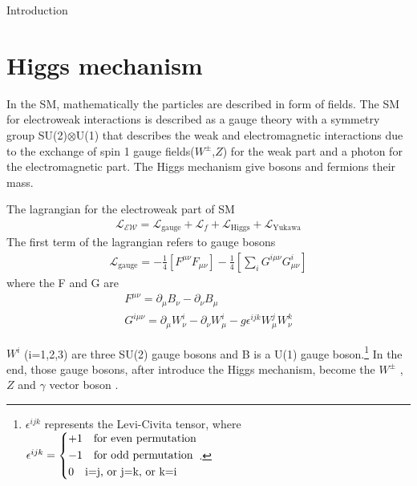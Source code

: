 \begin{chapter}{Introduction}
\pagebreak



\section{Higgs mechanism}
In the SM, mathematically the particles are described in form of fields. The SM for electroweak interactions is described as a gauge theory with a symmetry group SU(2)$\otimes$U(1)
that describes the weak and electromagnetic interactions
due to the exchange of spin 1 gauge fields($W^{\pm}$,$Z$) for the weak part and a photon for the electromagnetic part. The Higgs mechanism give bosons and fermions their mass. 

The lagrangian for the electroweak part of SM
\begin{align}\label{sml}
\mathcal{L_{\text{EW}}}=\mathcal{L}_\text{gauge}+\mathcal{L}_f +\mathcal{L}_\text{Higgs} + \mathcal{L}_\text{Yukawa}
\end{align}
The first term of the lagrangian refers to gauge bosons  
 \begin{align}\label{smg}
 \mathcal{L}_\text{gauge}=-\frac{1}{4}\left[F^{\mu\nu}F_{\mu\nu}\right]-\frac{1}{4}\left[\sum_{i}G^{i\mu\nu}G^i_{\mu\nu}\right]
 \end{align}
where  the  F and G  are 
\begin{align}
F^{\mu \nu}=\partial_\mu B_\nu -\partial_\nu B_\mu \\
G^{i\mu\nu}=\partial_\mu W^i_\nu -\partial_\nu W^i_\mu -g\epsilon^{ijk}W^j_\mu W^k_\nu 
\end{align}

$W^i$ (i=1,2,3) are three  SU(2) gauge bosons and B is a U(1) gauge boson.\footnote{$\epsilon^{ijk}$ represents the Levi-Civita tensor, where $\epsilon^{ijk}= \begin{dcases}
	+1 \quad  \text{for even permutation} \\
	-1 \quad \text{for odd permutation}\\
	0 \quad \text{i=j, or j=k, or k=i } 
	\end{dcases}$.} In the end, those gauge bosons, after introduce the Higgs mechanism, become the $W^\pm$ , $Z$ and $\gamma$ vector boson \cite{ew1,ew2}. %
\\


\end{chapter}

